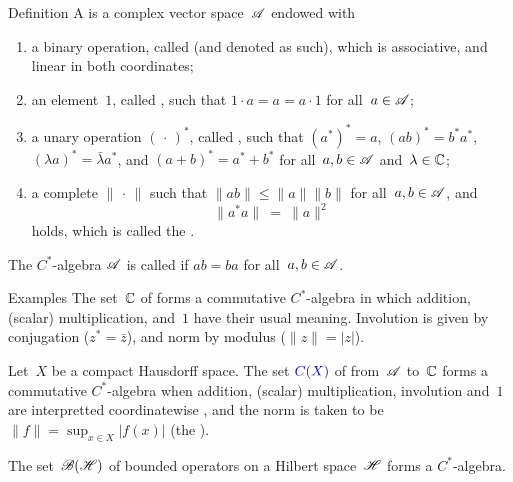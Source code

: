 \documentclass[main]{subfiles}
\begin{document}
\begin{parsec}%
\begin{point}{Definition}%
A 
is a complex vector space~$\mathscr{A}$
endowed with
\begin{enumerate}
\item
a binary operation,
called 
(and denoted as such),
which is associative, and linear in both coordinates;
\item
an element~$1$, called ,
such that $1\cdot a = a = a\cdot 1$
for all~$a\in \mathscr{A}$;
\item
a unary operation $(\,\cdot\,)^*$,
called ,
such that $(a^*)^*=a$,
$(ab)^*=b^*a^*$,
$(\lambda a)^* = \bar\lambda a^*$,
and $(a+b)^* = a^*+b^*$
for all~$a,b\in\mathscr{A}$ and~$\lambda\in \mathbb{C}$;
\item
a complete  $\|\,\cdot\,\|$
such that
$\|ab\|\leq\|a\|\|b\|$
for all~$a,b\in\mathscr{A}$,
and 
\begin{equation*}
\label{eq:Cstar-identity}
\|a^*a\|\ =\ \|a\|^2
\end{equation*}
holds, which is called the .
\end{enumerate}
The $C^*$-algebra $\mathscr{A}$ is called 
if $ab=ba$ for all~$a,b\in\mathscr{A}$.
\end{point}
\end{parsec}
\begin{parsec}%
\begin{point}{Examples}%
The set~$\mathbb{C}$ of 
forms a commutative  $C^*$-algebra
in which addition, (scalar) multiplication, and~$1$
have their usual meaning.
Involution is given by conjugation ($z^*=\bar{z}$),
and norm by modulus ($\|z\|=|z|$).
\begin{point}%
Let~$X$ be a compact Hausdorff space.
The set $\define{C(X)}$ of 
from~$\mathscr{A}$ to~$\mathbb{C}$
forms a commutative $C^*$-algebra
when addition, (scalar) multiplication, involution and~$1$ are
interpretted coordinatewise ,
and the norm is taken to be 
$\|f\|=\sup_{x\in X} |f(x)|$
(the ).
\begin{point}%
The set~$\mathscr{B}(\mathscr{H})$ of bounded operators
on a Hilbert space~$\mathscr{H}$ forms a $C^*$-algebra.
\end{point}
\end{point}
\end{point}
\end{parsec}
\end{document}
